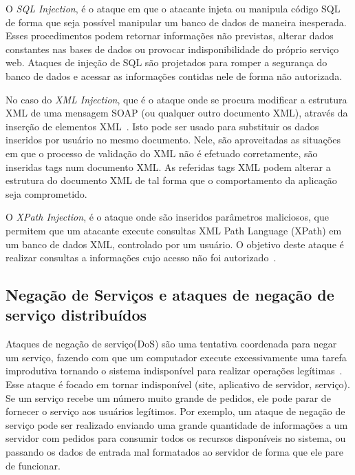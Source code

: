 O \emph{SQL Injection}, é o ataque em que o atacante injeta ou manipula código SQL de forma que seja possível manipular um banco de dados de maneira inesperada\cite{harwood2010security}. Esses procedimentos podem retornar informações não previstas, alterar dados constantes nas bases de dados ou provocar indisponibilidade do próprio serviço web.  Ataques de injeção de SQL são projetados para romper a segurança do banco de dados e acessar as informações contidas nele de forma não autorizada.

No caso do \emph{XML Injection}, que é o ataque onde se procura modificar a estrutura XML de uma mensagem SOAP (ou qualquer outro documento XML), através da inserção de elementos XML~\cite{JensenGHL2007}. Isto pode ser usado para substituir os dados inseridos por usuário no mesmo documento. Nele, são aproveitadas as situações em que o processo de validação do XML não é efetuado corretamente, são inseridas tags num documento XML. As referidas tags XML podem alterar a estrutura do documento XML de tal forma que o comportamento da aplicação seja comprometido.

O \emph{XPath Injection}, é o ataque onde são inseridos parâmetros maliciosos, que permitem que um atacante execute consultas XML Path Language (XPath) em um banco de dados XML, controlado por um usuário. O objetivo deste ataque é realizar consultas a informações cujo acesso não foi autorizado~\cite{harwood2010security}.

\subsection{Negação de Serviços e ataques de negação de serviço distribuídos}

Ataques de negação de serviço(DoS) são uma tentativa coordenada para negar um serviço, fazendo com que um computador execute excessivamente uma tarefa improdutiva tornando o sistema indisponível para realizar operações legítimas~\cite{kim2010fundamentals}. Esse ataque é focado em tornar indisponível (site, aplicativo de servidor, serviço). Se um serviço recebe um número muito grande de pedidos, ele pode parar de fornecer o serviço aos usuários legítimos. Por exemplo, um ataque de negação de serviço pode ser realizado enviando uma grande quantidade de informações a um servidor com pedidos para consumir todos os recursos disponíveis no sistema, ou passando os dados de entrada mal formatados ao servidor de forma que ele pare de funcionar.

